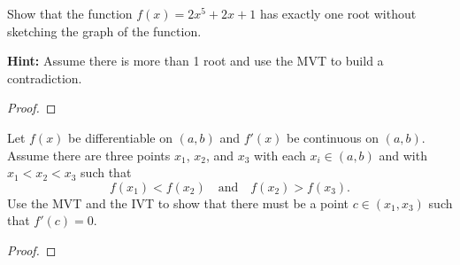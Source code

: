 \question Show that the function $f(x)=2x^5+2x+1$ has exactly one root without sketching the graph of the function.

\textbf{Hint:} Assume there is more than 1 root and use the MVT to build a contradiction.
\begin{proof}
\end{proof}


\question Let $f(x)$ be differentiable on $(a, b)$ and $f'(x)$ be continuous on $(a, b)$.
Assume there are three points $x_1$, $x_2$, and $x_3$ with each $x_i\in(a,b)$
and with $x_1<x_2<x_3$ such that \[ f(x_1) < f(x_2) \quad \textrm{and} \quad f(x_2) > f(x_3). \]
Use the MVT and the IVT to show that there must be a point $c\in(x_1, x_3)$ such that $f'(c) = 0$.
\begin{proof}
\end{proof}

